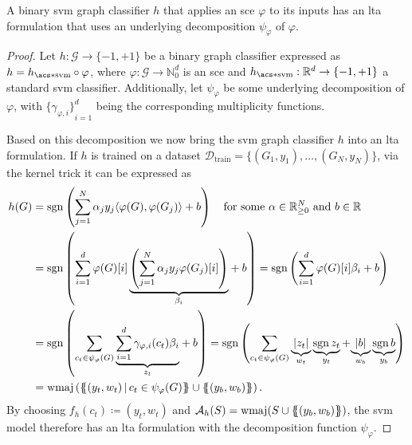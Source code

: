 \begin{thm}\label{thm:ltag:svm-ltag-formulation}
	A binary \ac{svm} graph classifier $h$ that applies an \ac{sce} $\varphi$ to its inputs has an \ac{lta} formulation that uses an underlying decomposition $\psi_{\varphi}$ of $\varphi$.
\end{thm}
\begin{proof}
	Let $h: \mathcal{G} \to {\{ -1, +1 \}}$ be a binary graph classifier expressed as $h = h_{\mathrm{\acs*{svm}}} \circ \varphi$, where $\varphi: \mathcal{G} \to \mathbb{N}_0^{d}$ is an \ac{sce} and $h_{\mathrm{\acs*{svm}}}: \mathbb{R}^{d} \to {\{ -1, +1 \}}$ a standard \ac{svm} classifier.
	Additionally, let $\psi_{\varphi}$ be some underlying decomposition of $\varphi$, with ${\{ \gamma_{\varphi, i} \}}_{i=1}^d$ being the corresponding multiplicity functions.

	Based on this decomposition we now bring the \ac{svm} graph classifier $h$ into an \ac{lta} formulation.
	If $h$ is trained on a dataset $\mathcal{D}_{\mathrm{train}} = {\{ (G_1, y_1), \dots, (G_N, y_N) \}}$, via the kernel trick it can be expressed as
	\begin{align*}
		h(G) &= \sgn\left( \sum_{j = 1}^{N} \alpha_j y_j {\langle \varphi(G), \varphi(G_j) \rangle} + b \right)
		\quad\text{for some $\alpha \in \mathbb{R}_{\geq 0}^N$ and $b \in \mathbb{R}$} \\
		&= \sgn\left( {\sum_{i=1}^{d} {
				\varphi(G)[i]
				\underbrace{\left( \sum_{j = 1}^{N} \alpha_j y_j {\varphi(G_j)}[i] \right)}_{\beta_i}}
			} + b \right)
		 = \sgn\left( {\sum_{i=1}^{d} \varphi(G)[i] \beta_i} + b \right) \\
		&= \sgn\left( {\sum_{c_t \in \psi_{\varphi}(G)} \underbrace{\sum_{i = 1}^d \gamma_{\varphi, i}(c_t) \beta_i}_{z_t}} + b \right)
		 = \sgn\left( {\sum_{c_t \in \psi_{\varphi}(G)}} \underbrace{|z_t|}_{w_t} \underbrace{\sgn{z_t}}_{y_t} + {\underbrace{|b|}_{w_b} \underbrace{\sgn{b}}_{y_b}} \right) \\
		&= \wmaj\left( \ldblbrace (y_t, w_t)\, |\, c_t \in \psi_{\varphi}(G) \rdblbrace \cup \ldblbrace (y_b, w_b) \rdblbrace \right)
		\text{.}
	\end{align*}
	By choosing $f_h(c_t) \coloneqq (y_t, w_t)$ and $\mathcal{A}_h(S) = \wmaj(S \cup \ldblbrace (y_b, w_b) \rdblbrace)$, the \ac{svm} model therefore has an \ac{lta} formulation with the decomposition function $\psi_{\varphi}$.


\end{proof}
